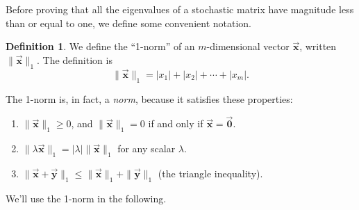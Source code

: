 \documentclass[reqno]{immbook}
\newcommand{\BX}{\vec{\textbf{x}}}
\newcommand{\BY}{\vec{\textbf{y}}}
\newcommand{\BZero}{\vec{\textbf{0}}}  %
\numberwithin{equation}{chapter}
\numberwithin{question}{section}
\numberwithin{theorem}{chapter}
\numberwithin{figure}{chapter}
\theoremstyle{definition}
\newtheorem{definition}{Definition}[section]
\begin{document}
Before proving that all the eigenvalues of a stochastic
matrix have magnitude less than or equal to one, we
define some convenient notation.

\begin{definition}
We define the ``1-norm'' of an $m$-dimensional vector
$\BX$, written
$\|\BX\|_1$.  The definition is
\begin{equation}
  \| \BX \|_1 = |x_1| + |x_2| + \cdots + |x_m|.
\end{equation}
\end{definition}
The 1-norm is, in fact, a \emph{norm}, because it
satisfies these properties:
\begin{enumerate}
\item $\|\BX\|_1 \ge 0$, and $\|\BX\|_1 = 0$ if and only
if $\BX = \BZero$.
\item $\|\lambda \BX\|_1 = |\lambda|\|\BX\|_1$ for any
scalar $\lambda$.
\item $\|\BX+\BY\|_1 \le \|\BX\|_1 + \|\BY\|_1$
(the triangle inequality).
\end{enumerate}

We'll use the 1-norm in the following.
\end{document}
